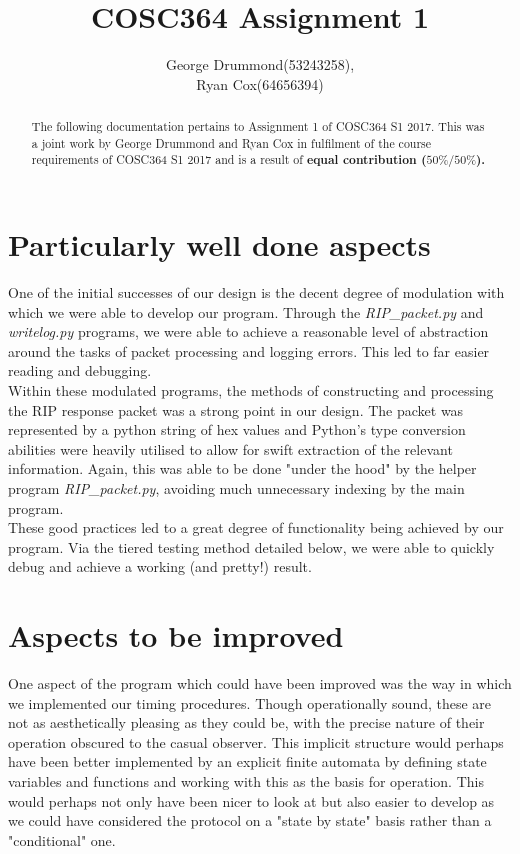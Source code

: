 \documentclass[12pt,twoside]{article}
\begin{document}
\title{COSC364 Assignment 1}
\author{George Drummond(53243258), \\Ryan Cox(64656394)}
\maketitle
\thispagestyle{empty}

\begin{abstract}
The following documentation pertains to Assignment 1 of COSC364 S1 2017.
This was a joint work by George Drummond and Ryan Cox in fulfilment of the course requirements of COSC364 S1 2017 and is a result of \bf{equal} contribution ($50\% / 50\%$).
\end{abstract}

\tableofcontents

\section{ Particularly well done aspects}

One of the initial successes of our design is the decent degree of modulation with which we were able to develop our program. Through the \textit{RIP\_packet.py} and \textit{writelog.py} programs, we were able to achieve a reasonable level of abstraction around the tasks of packet processing and logging errors. This led to far easier reading and debugging.\\

Within these modulated programs, the methods of constructing and processing the RIP response packet was a strong point in our design. The packet was represented by a python string of hex values and Python’s type conversion abilities were heavily utilised to allow for swift extraction of the relevant information. Again, this was able to be done "under the hood" by the helper program \textit{RIP\_packet.py}, avoiding much unnecessary indexing by the main program.\\

These good practices led to a great degree of functionality being achieved by our program. Via the tiered testing method detailed below, we were able to quickly debug and achieve a working (and pretty!) result.
\section{Aspects to be improved}

One aspect of the program which could have been improved was the way in which we implemented our timing procedures. Though operationally sound, these are not as aesthetically pleasing as they could be, with the precise nature of their operation obscured to the casual observer. This implicit structure would perhaps have been better implemented by an explicit finite automata by defining state variables and functions and working with this as the basis for operation. This would perhaps not only have been nicer to look at but also easier to develop as we could have considered the protocol on a "state by state" basis rather than a "conditional" one.
\end{document}
